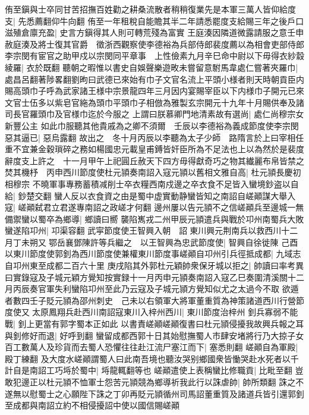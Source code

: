 侑至鎭與士卒同甘苦招撫百姓勸之耕桑流散者稍稍復業先是本軍三萬人皆仰給度支|{
	先悉薦翻仰牛向翻}
侑至一年租稅自能贍其半二年請悉罷度支給賜三年之後戶口滋殖倉廪充盈|{
	史言方鎭得其人則可轉荒殘為富實}
王庭湊因隣道微露請服之意壬申赦庭湊及將士復其官爵　徵浙西觀察使李德裕為兵部侍郎裴度薦以為相會吏部侍郎李宗閔有宦官之助甲戍以宗閔同平章事　上性儉素九月辛巳命中尉以下毋得衣紗縠綾羅|{
	衣於既翻}
聽朝之暇惟以書史自娛聲樂遊畋未嘗留意駙馬韋處仁嘗著夾羅巾|{
	處昌呂翻著陟畧翻劉昫曰武德已來始有巾子文官名流上平頭小様者則天時朝貢臣内賜高頭巾子呼為武家諸王様中宗景龍四年三月因内宴賜宰臣以下内様巾子開元已來文官士伍多以紫皂官絁為頭巾平頭巾子相倣為雅製玄宗開元十九年十月賜供奉及諸司長官羅頭巾及官様巾迄於今服之}
上謂曰朕慕卿門地清素故有選尚|{
	處仁尚穆宗女新豐公主}
如此巾服聽其他貴戚為之卿不須爾　壬辰以李德裕為義成節度使李宗閔惡其逼已|{
	惡烏露翻}
故出之　冬十月丙辰以李聽為太子少師　路隋言於上曰宰相任重不宜兼金穀瑣碎之務如楊國忠元載皇甫鎛皆奸臣所為不足法也上以為然於是裴度辭度支上許之　十一月甲午上祀圓丘赦天下四方毋得獻奇巧之物其纎麗布帛皆禁之焚其機杼　丙申西川節度使杜元頴奏南詔入寇元頴以舊相文雅自高|{
	杜元頴長慶初相穆宗}
不曉軍事專務蓄積减削士卒衣糧西南戍邊之卒衣食不足皆入蠻境鈔盗以自給|{
	鈔楚交翻}
蠻人反以衣食資之由是蜀中虚實動静蠻皆知之南詔自嵯顚謀大舉入寇|{
	嵯顚弑君立君遂專南詔之政嵯才何翻}
邊州屢以告元頴不之信嵯顚兵至邊城一無備禦蠻以蜀卒為鄉導|{
	鄉讀曰嚮}
襲陷嶲戎二州甲辰元頴遣兵與戰於卭州南蜀兵大敗蠻遂陷卭州|{
	卭渠容翻}
武寜節度使王智興入朝　詔東川興元荆南兵以救西川十二月丁未朔又鄂岳襄鄧陳許等兵繼之　以王智興為忠武節度使|{
	智興自徐徙陳}
己酉以東川節度使郭釗為西川節度使兼權東川節度事嵯顚自卭州引兵徑抵成都|{
	九域志自卭州東至成都二百六十里}
庚戌陷其外郭杜元穎帥衆保牙城以拒之|{
	帥讀曰率考異曰實錄寇及子城元穎方覺知按實録十一月丙申元頴奏南詔入寇乙巳奏圍清溪關十二月丙辰奏官軍失利蠻陷卭州至此乃云寇及子城元頴方覺知似尤之太過今不取}
欲遁者數四壬子貶元頴為邵州刺史　己未以右領軍大將軍董重質為神策諸道西川行營節度使又太原鳳翔兵赴西川南詔寇東川入梓州西川|{
	東川節度治梓州}
釗兵寡弱不能戰|{
	釗上更當有郭字蜀本正如此}
以書責嵯顚嵯顚復書曰杜元頴侵擾我故興兵報之耳與釗修好而退|{
	好呼到翻}
蠻留成都西郭十日其始慰撫蜀人市肆安堵將行乃大掠子女百工數萬人及珍貨而去蜀人恐懼往往赴江流尸塞江而下|{
	塞悉則翻}
嵯顚自為軍殿|{
	殿丁練翻}
及大度水嵯顚謂蜀人曰此南吾境也聽汝哭别鄉國衆皆慟哭赴水死者以千計自是南詔工巧埓於蜀中|{
	埓龍輒翻等也}
嵯顚遣使上表稱蠻比修職貢|{
	比毗至翻}
豈敢犯邊正以杜元頴不恤軍士怨苦元頴競為鄉導祈我此行以誅虐帥|{
	帥所類翻}
誅之不遂無以慰蜀士之心願陛下誅之丁卯再貶元頴循州司馬詔董重質及諸道兵皆引還郭釗至成都與南詔立約不相侵擾詔中使以國信賜嵯顚

